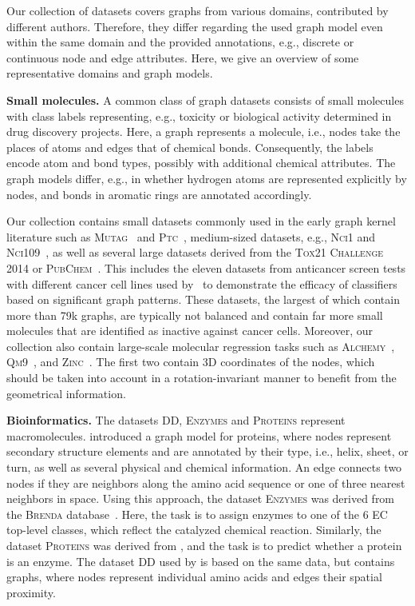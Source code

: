 \documentclass{article}
\newcommand{\xhdr}[1]{{\noindent\bfseries #1}}
\theoremstyle{definition}
\begin{document}
Our collection of datasets covers graphs from various domains, contributed by different authors. Therefore, they differ regarding the used graph model even within the same domain and the provided annotations, e.g., discrete or continuous node and edge attributes. Here, we give an overview of some representative domains and graph models.

\xhdr{Small molecules.} 
A common class of graph datasets consists of small molecules with class labels representing, e.g., toxicity or biological activity determined in drug discovery projects. Here, a graph represents a molecule, i.e., nodes take the places of atoms and edges that of chemical bonds. Consequently, the labels encode atom and bond types, possibly with additional chemical attributes. The graph models differ, e.g., in whether hydrogen atoms are represented explicitly by nodes, and bonds in aromatic rings are annotated accordingly.

Our collection contains small datasets commonly used in the early graph kernel literature such as \textsc{Mutag}~\cite{Deb+1991} and \textsc{Ptc}~\cite{Helma2001}, medium-sized datasets, e.g., \textsc{Nci1} and \textsc{Nci109}~\cite{Wal+2008,She+2011}, as well as several large datasets derived from the \textsc{Tox21 Challenge 2014} or \textsc{PubChem}~\cite{Kim2018}. This includes the eleven datasets from anticancer screen tests with different cancer cell lines used by~\citet{Yan2008} to demonstrate the efficacy of classifiers based on significant graph patterns. These datasets, the largest of which contain more than 79k graphs, are typically not balanced and contain far more small molecules that are identified as inactive against cancer cells. Moreover, our collection also contain large-scale molecular regression tasks such as \textsc{Alchemy}~\cite{Che+2020}, \textsc{Qm9}~\cite{Ram+2014}, and \textsc{Zinc}~\cite{Dwi+2020,Jin+2018a}. The first two contain 3D coordinates of the nodes, which should be taken into account in a rotation-invariant manner to benefit from the geometrical information.


\xhdr{Bioinformatics.}
The datasets \textsc{DD}, \textsc{Enzymes} and \textsc{Proteins} represent macromolecules. \citet{Bor+2005a} introduced a graph model for proteins, where nodes represent secondary structure elements and are annotated by their type, i.e., helix, sheet, or turn, as well as several physical and chemical information. An edge connects two nodes if they are neighbors along the amino acid sequence or one of three nearest neighbors in space. Using this approach, the dataset \textsc{Enzymes} was derived from the \textsc{Brenda} database~\cite{Schomburg2004}. Here, the task is to assign enzymes to one of the 6 EC top-level classes, which reflect the catalyzed chemical reaction. Similarly, the dataset \textsc{Proteins} was derived from \citep{Dob+2003}, and the task is to predict whether a protein is an enzyme. The dataset \textsc{DD} used by \citet{She+2011} is based on the same data, but contains graphs, where nodes represent individual amino acids and edges their spatial proximity.
\end{document}
